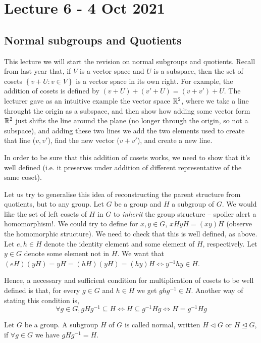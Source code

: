 \section{Lecture 6 - 4 Oct 2021}
\subsection{Normal subgroups and Quotients}
This lecture we will start the revision on normal subgroups and quotients.
Recall from last year that, if $V$ is a vector space and $U$ is a subspace, then the set
of cosets $\left\{ v+ U: v\in V \right\}$ is a vector space in its own right. For example,
the addition of cosets is defined by $(v+U)+(v'+U)=(v+v')+U$. The lecturer gave as an
intuitive example the vector space $\mathbb R^2$, where we take a line throught the origin as a
subspace, and then show how adding some vector form $\mathbb R^2$ just shifts the line around
the plane (no longer through the origin, so not a subspace), and adding these two lines we
add the two elements used to create that line ($v,v'$), find the new vector ($v+v'$), and
create a new line.

In order to be sure that this addition of cosets works, we need to show that it's well
defined (i.e. it preserves under addition of different representative of the same coset).


Let us try to generalise this idea of reconstructing the parent structure from quotients,
but to any group. Let $G$ be a group and $H$ a subgroup of $G$. We would like the set of
left cosets of $H$ in $G$ to \emph{inherit} the group structure -- spoiler alert a
homomorphism!. We could try to define for $x,y\in G$, $xH yH=(xy)H$ (observe the
homomorphic structure). We need to check that this is well defined, as above. Let $e,h\in
H$ denote the identity element and some element of $H$, respectively. Let $y\in G$ denote
some element not in $H$. We want that $(eH)(yH)=yH = (hH)(yH)=(hy)H \iff y^{-1}hy\in H$. 

Hence, a necessary and sufficient condition for multiplication of cosets
to be well defined is that, for every $g\in G$ and $h\in H$ we get $ghg^{-1}\in H$.
Another way of stating this condition is,
\[\forall g\in G, gHg^{-1}\subseteq H \iff H\subseteq g^{-1}H g \iff H=g^{-1}H g\]

\begin{definition}
  Let $G$ be a group. A subgroup $H$ of $G$ is called normal, written $H\triangleleft G$
  or $H\trianglelefteq G$, if $\forall g\in G$ we have $gHg^{-1}=H$.
  \label{normalSubgroup}
\end{definition}

